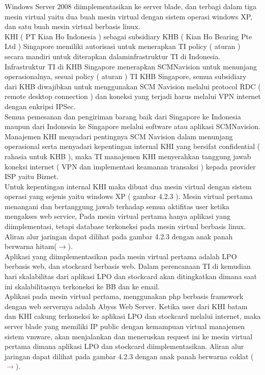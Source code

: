 Windows Server 2008 diimplementasikan ke server blade, dan terbagi dalam tiga mesin virtual yaitu dua buah mesin virtual dengan sistem operasi windows XP, dan satu buah mesin virtual berbasis linux.\\
\tab KHI ( PT Kian Ho Indonesia ) sebagai subsidiary KHB ( Kian Ho Bearing Pte Ltd ) Singapore memiliki autorisasi untuk menerapkan TI policy ( aturan ) secara mandiri untuk diterapkan dalaminfrastruktur  TI di Indonesia.\\
Infrastruktur TI di KHB Singapore menerapkan SCMNavision untuk menunjang operasionalnya, sesuai policy ( aturan ) TI KHB Singapore, semua subsidiary dari KHB diwajibkan untuk menggunakan SCM Navision melalui protocol RDC ( remote desktop connection ) dan koneksi yang terjadi harus melalui VPN internet dengan enkripsi IPSec.\\
Semua pemesanan dan pengiriman barang baik dari Singapore ke Indonesia maupun dari Indonesia ke Singapore melalui software atau aplikasi SCMNavision.\\
\tab Manajemen KHI menyadari pentingnya SCM Navision dalam menunjang  operasional serta menyadari kepentingan internal KHI yang bersifat confidential ( rahasia untuk  KHB  ), maka TI manajemen KHI menyerahkan tanggung jawab koneksi internet ( VPN dan implementasi keamanan transaksi ) kepada provider ISP yaitu  Biznet.\\
Untuk kepentingan internal KHI maka dibuat dua mesin virtual dengan sistem operasi yang sejenis yaitu windows XP ( gambar 4.2.3 ). Mesin virtual pertama menangani dan bertanggung jawab   terhadap   semua   aktifitas  user   ketika  mengakses   web  service,   Pada  mesin  virtual pertama hanya aplikasi yang diimplementasi, tetapi database terkoneksi pada mesin virtual berbasis linux. Aliran alur jaringan dapat dilihat pada gambar 4.2.3 dengan anak  panah berwarna hitam($\rightarrow$).\\
Aplikasi yang diimplementasikan pada mesin virtual pertama adalah LPO berbasis web, dan stockcard berbasis web. Dalam perencanaan TI di kemudian hari skalabilitas dari aplikasi LPO dan stockcard akan ditingkatkan dimana saat ini skalabilitasnya terkoneksi ke BB dan ke email.\\
Aplikasi pada mesin virtual pertama, menggunakan php berbasis framework dengan web servernya adalah Abyss Web Server.
Ketika user dari KHI batam dan KHI cakung terkoneksi ke aplikasi LPO dan stockcard melalui internet, maka server blade yang memiliki IP public dengan kemampuan virtual manajemen sistem vmware, akan menjalankan dan meneruskan request ini ke mesin  virtual  pertama dimana aplikasi LPO dan stockcard diimplementasikan. Aliran alur jaringan dapat dilihat pada gambar 4.2.3 dengan anak panah berwarna coklat (\textcolor{brown}{$\rightarrow$}).\\

